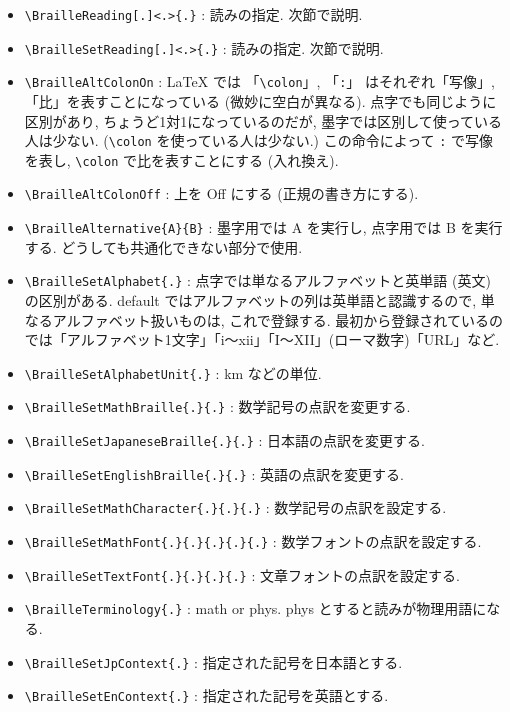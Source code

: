 \documentclass[lualatex,ja=standard,jafont=haranoaji]{bxjsarticle}
\begin{document}
\begin{itemize}
\item \verb|\BrailleReading[.]<.>{.}| : 読みの指定. 次節で説明.
\item \verb|\BrailleSetReading[.]<.>{.}| : 読みの指定. 次節で説明.
\item \verb|\BrailleAltColonOn| : LaTeX では 「\verb|\colon|」, 「\verb|:|」 はそれぞれ「写像」, 「比」を表すことになっている (微妙に空白が異なる). 点字でも同じように区別があり, ちょうど1対1になっているのだが, 墨字では区別して使っている人は少ない. (\verb|\colon| を使っている人は少ない.)
  この命令によって \verb|:| で写像を表し, \verb|\colon| で比を表すことにする (入れ換え).
\item \verb|\BrailleAltColonOff| : 上を Off にする (正規の書き方にする).
\item \verb|\BrailleAlternative{A}{B}| : 墨字用では A を実行し, 点字用では B を実行する. どうしても共通化できない部分で使用.
\item \verb|\BrailleSetAlphabet{.}| : 点字では単なるアルファベットと英単語 (英文) の区別がある. default ではアルファベットの列は英単語と認識するので, 単なるアルファベット扱いものは, これで登録する. 最初から登録されているのでは「アルファベット1文字」「i〜xii」「I〜XII」(ローマ数字)「URL」など.
\item \verb|\BrailleSetAlphabetUnit{.}| : km などの単位.
\item \verb|\BrailleSetMathBraille{.}{.}| : 数学記号の点訳を変更する.
\item \verb|\BrailleSetJapaneseBraille{.}{.}| : 日本語の点訳を変更する.
\item \verb|\BrailleSetEnglishBraille{.}{.}| : 英語の点訳を変更する.
\item \verb|\BrailleSetMathCharacter{.}{.}{.}| : 数学記号の点訳を設定する.
\item \verb|\BrailleSetMathFont{.}{.}{.}{.}{.}| : 数学フォントの点訳を設定する.
\item \verb|\BrailleSetTextFont{.}{.}{.}{.}| : 文章フォントの点訳を設定する.
\item \verb|\BrailleTerminology{.}| : math or phys. phys とすると読みが物理用語になる.
\item \verb|\BrailleSetJpContext{.}| : 指定された記号を日本語とする.
\item \verb|\BrailleSetEnContext{.}| : 指定された記号を英語とする.
\end{itemize}
\end{document}
